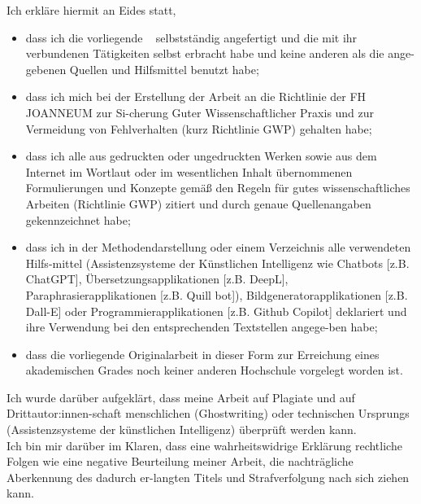 %

\thispagestyle{empty}
 {\hfill\fontfamily{\sfdefault}\bfseries\fontsize{22}{22}\selectfont{Eidesstattliche Erklärung}}\vspace*{1cm}

\noindent Ich erkläre hiermit an Eides statt,

\begin{itemize}
	\item {dass ich die vorliegende \DocTypeText~ selbstständig angefertigt und die mit ihr verbundenen Tätigkeiten selbst erbracht habe und keine anderen als die ange-gebenen Quellen und Hilfsmittel benutzt habe;}
	\item {dass ich mich bei der Erstellung der Arbeit an die Richtlinie der FH JOANNEUM zur Si-cherung Guter Wissenschaftlicher Praxis und zur Vermeidung von Fehlverhalten (kurz Richtlinie GWP) gehalten habe;}
	\item {dass ich alle aus gedruckten oder ungedruckten Werken sowie aus dem Internet im Wortlaut oder im wesentlichen Inhalt übernommenen Formulierungen und Konzepte gemäß den Regeln für gutes wissenschaftliches Arbeiten (Richtlinie GWP) zitiert und durch genaue Quellenangaben gekennzeichnet habe;}
	\item {dass ich in der Methodendarstellung oder einem Verzeichnis alle verwendeten Hilfs-mittel (Assistenzsysteme der Künstlichen Intelligenz wie Chatbots [z.B. ChatGPT], Übersetzungsapplikationen [z.B. DeepL], Paraphrasierapplikationen [z.B. Quill bot]), Bildgeneratorapplikationen [z.B. Dall-E] oder Programmierapplikationen [z.B. Github Copilot] deklariert und ihre Verwendung bei den entsprechenden Textstellen angege-ben habe;}
	\item {dass die vorliegende Originalarbeit in dieser Form zur Erreichung eines akademischen Grades noch keiner anderen Hochschule vorgelegt worden ist.}
\end{itemize}

\noindent Ich wurde darüber aufgeklärt, dass meine Arbeit auf Plagiate und auf Drittautor:innen-schaft menschlichen (Ghostwriting) oder technischen Ursprungs (Assistenzsysteme der künstlichen Intelligenz) überprüft werden kann.\\

\noindent Ich bin mir darüber im Klaren, dass eine wahrheitswidrige Erklärung rechtliche Folgen wie eine negative Beurteilung meiner Arbeit, die nachträgliche Aberkennung des dadurch er-langten Titels und Strafverfolgung nach sich ziehen kann.


\ifthenelse{\equal{\Style}{\Book}}
{
	\newpage\null\thispagestyle{empty}\newpage
}
{
}


